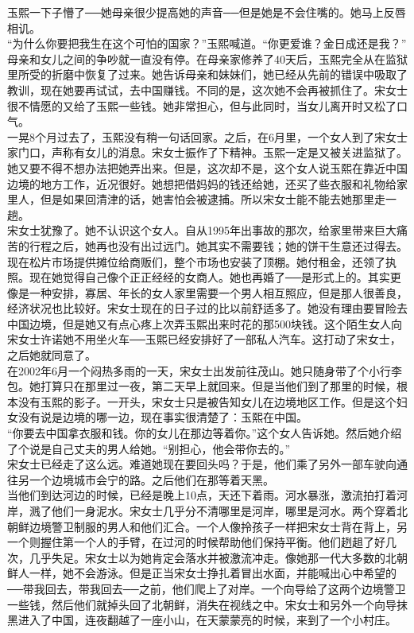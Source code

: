 玉熙一下子懵了──她母亲很少提高她的声音──但是她是不会住嘴的。她马上反唇相讥。\\

“为什么你要把我生在这个可怕的国家？”玉熙喊道。“你更爱谁？金日成还是我？”\\

母亲和女儿之间的争吵就一直没有停。在母亲家修养了40天后，玉熙完全从在监狱里所受的折磨中恢复了过来。她告诉母亲和妹妹们，她已经从先前的错误中吸取了教训，现在她要再试试，去中国赚钱。不同的是，这次她不会再被抓住了。宋女士很不情愿的又给了玉熙一些钱。她非常担心，但与此同时，当女儿离开时又松了口气。\\

一晃8个月过去了，玉熙没有稍一句话回家。之后，在6月里，一个女人到了宋女士家门口，声称有女儿的消息。宋女士振作了下精神。玉熙一定是又被关进监狱了。她又要不得不想办法把她弄出来。但是，这次却不是，这个女人说玉熙在靠近中国边境的地方工作，近况很好。她想把借妈妈的钱还给她，还买了些衣服和礼物给家里人，但是如果回清津的话，她害怕会被逮捕。所以宋女士能不能去她那里走一趟。\\

宋女士犹豫了。她不认识这个女人。自从1995年出事故的那次，给家里带来巨大痛苦的行程之后，她再也没有出过远门。她其实不需要钱；她的饼干生意还过得去。现在松片市场提供摊位给商贩们，整个市场也安装了顶棚。她付租金，还领了执照。现在她觉得自己像个正正经经的女商人。她也再婚了──是形式上的。其实更像是一种安排，寡居、年长的女人家里需要一个男人相互照应，但是那人很善良，经济状况也比较好。宋女士现在的日子过的比以前舒适多了。她没有理由要冒险去中国边境，但是她又有点心疼上次弄玉熙出来时花的那500块钱。这个陌生女人向宋女士许诺她不用坐火车──玉熙已经安排好了一部私人汽车。这打动了宋女士，之后她就同意了。\\

在2002年6月一个闷热多雨的一天，宋女士出发前往茂山。她只随身带了个小行李包。她打算只在那里过一夜，第二天早上就回来。但是当他们到了那里的时候，根本没有玉熙的影子。一开头，宋女士只是被告知女儿在边境地区工作。但是这个妇女没有说是边境的哪一边，现在事实很清楚了：玉熙在中国。\\

“你要去中国拿衣服和钱。你的女儿在那边等着你。”这个女人告诉她。然后她介绍了个说是自己丈夫的男人给她。“别担心，他会带你去的。”\\

宋女士已经走了这么远。难道她现在要回头吗？于是，他们乘了另外一部车驶向通往另一个边境城市会宁的路。之后他们在那等着天黑。\\

当他们到达河边的时候，已经是晚上10点，天还下着雨。河水暴涨，激流拍打着河岸，溅了他们一身泥水。宋女士几乎分不清哪里是河岸，哪里是河水。两个穿着北朝鲜边境警卫制服的男人和他们汇合。一个人像拎孩子一样把宋女士背在背上，另一个则握住第一个人的手臂，在过河的时候帮助他们保持平衡。他们趔趄了好几次，几乎失足。宋女士以为她肯定会落水并被激流冲走。像她那一代大多数的北朝鲜人一样，她不会游泳。但是正当宋女士挣扎着冒出水面，并能喊出心中希望的──带我回去，带我回去──之前，他们爬上了对岸。一个向导给了这两个边境警卫一些钱，然后他们就掉头回了北朝鲜，消失在视线之中。宋女士和另外一个向导抹黑进入了中国，连夜翻越了一座小山，在天蒙蒙亮的时候，来到了一个小村庄。\\

